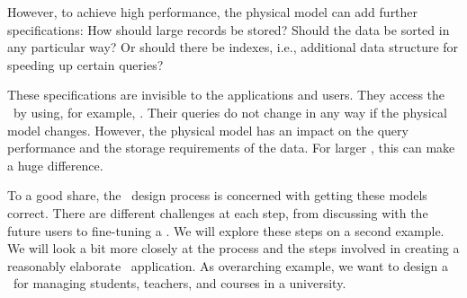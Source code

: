 However, to achieve high performance, the physical model can add further specifications:
How should large records be stored?
Should the data be sorted in any particular way?
Or should there be indexes, i.e., additional data structure for speeding up certain queries?

These specifications are invisible to the applications and users.
They access the \db\ by using, for example, \sql.
Their queries do not change in any way if the physical model changes.
However, the physical model has an impact on the query performance and the storage requirements of the data.
For larger , this can make a huge difference.

To a good share, the \db\ design process is concerned with getting these models correct.
There are different challenges at each step, from discussing with the future users to fine-tuning a \dbms.
We will explore these steps on a second example.
We will look a bit more closely at the process and the steps involved in creating a reasonably elaborate \db\ application.
As overarching example, we want to design a \db\ for managing students, teachers, and courses in a university.%
%
%
%
%
%
%
%
\endhsection%
%

